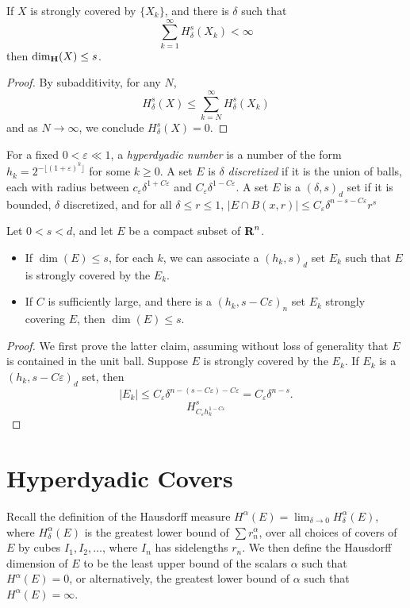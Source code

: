 \begin{theorem}
	If $X$ is strongly covered by $\{ X_k \}$, and there is $\delta$ such that
	\[ \sum_{k = 1}^\infty H^s_\delta(X_k) < \infty \]
	then $\operatorname{\dim_{\mathbf{H}}}(X) \leq s$.
\end{theorem}
\begin{proof}
	By subadditivity, for any $N$,
	\[ H^s_\delta(X) \leq \sum_{k = N}^\infty H^s_\delta(X_k) \]
	and as $N \to \infty$, we conclude $H^s_\delta(X) = 0$.
\end{proof}

For a fixed $0 < \varepsilon \ll 1$, a \emph{hyperdyadic number} is a number of the form $h_k = 2^{-\lfloor (1 + \varepsilon)^k \rfloor}$ for some $k \geq 0$. A set $E$ is \emph{$\delta$ discretized} if it is the union of balls, each with radius between $c_\varepsilon \delta^{1 + C\varepsilon}$ and $C_\varepsilon \delta^{1-C\varepsilon}$. A set $E$ is a $(\delta,s)_d$ set if it is bounded, $\delta$ discretized, and for all $\delta \leq r \leq 1$, $|E \cap B(x,r)| \leq C_\varepsilon \delta^{n-s-C\varepsilon} r^s$

\begin{lemma}
	Let $0 < s < d$, and let $E$ be a compact subset of $\operatorname{\mathbf{R}}^n$.
	\begin{itemize}
		\item If $\dim(E) \leq s$, for each $k$, we can associate a $(h_k,s)_d$ set $E_k$ such that $E$ is strongly covered by the $E_k$.

		\item If $C$ is sufficiently large, and there is a $(h_k, s - C\varepsilon)_n$ set $E_k$ strongly covering $E$, then $\dim(E) \leq s$.
	\end{itemize}
\end{lemma}
\begin{proof}
	We first prove the latter claim, assuming without loss of generality that $E$ is contained in the unit ball. Suppose $E$ is strongly covered by the $E_k$. If $E_k$ is a $(h_k,s - C\varepsilon)_d$ set, then
	\[ |E_k| \leq C_\varepsilon \delta^{n-(s-C\varepsilon)-C\varepsilon} = C_\varepsilon \delta^{n-s}. \]
	\[ H^s_{C_\varepsilon h_k^{1 - C\varepsilon}} \]
\end{proof}

\section{Hyperdyadic Covers}

Recall the definition of the Hausdorff measure $H^\alpha(E) = \lim_{\delta \to 0} H^\alpha_\delta(E)$, where $H^\alpha_\delta(E)$ is the greatest lower bound of $\sum r_n^\alpha$, over all choices of covers of $E$ by cubes $I_1, I_2, \dots$, where $I_n$ has sidelengths $r_n$. We then define the Hausdorff dimension of $E$ to be the least upper bound of the scalars $\alpha$ such that $H^\alpha(E) = 0$, or alternatively, the greatest lower bound of $\alpha$ such that $H^\alpha(E) = \infty$.

